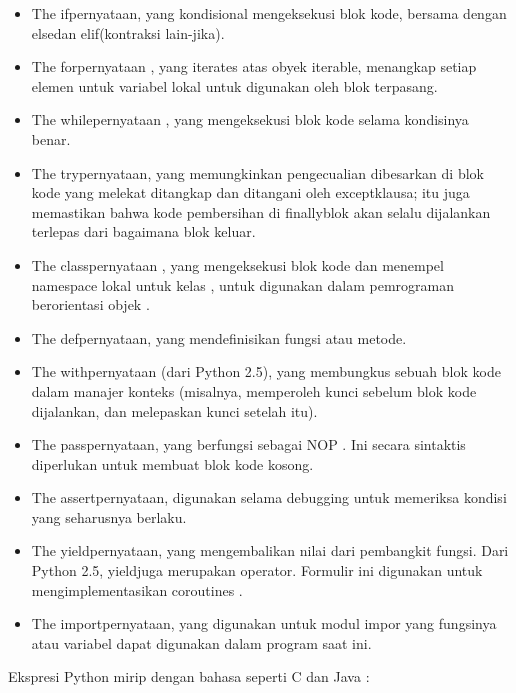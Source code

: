 \begin{itemize}
\item The ifpernyataan, yang kondisional mengeksekusi blok kode, bersama dengan elsedan elif(kontraksi lain-jika).\\
\item The forpernyataan , yang iterates atas obyek iterable, menangkap setiap elemen untuk variabel lokal untuk digunakan oleh blok terpasang.\\
\item The whilepernyataan , yang mengeksekusi blok kode selama kondisinya benar.\\
\item The trypernyataan, yang memungkinkan pengecualian dibesarkan di blok kode yang melekat ditangkap dan ditangani oleh exceptklausa; itu juga memastikan bahwa kode pembersihan di finallyblok akan selalu dijalankan terlepas dari bagaimana blok keluar.\\
\item The classpernyataan , yang mengeksekusi blok kode dan menempel namespace lokal untuk kelas , untuk digunakan dalam pemrograman berorientasi objek .\\
\item The defpernyataan, yang mendefinisikan fungsi atau metode.\\
\item The withpernyataan (dari Python 2.5), yang membungkus sebuah blok kode dalam manajer konteks (misalnya, memperoleh kunci sebelum blok kode dijalankan, dan melepaskan kunci setelah itu).\\
\item The passpernyataan, yang berfungsi sebagai NOP . Ini secara sintaktis diperlukan untuk membuat blok kode kosong.\\
\item The assertpernyataan, digunakan selama debugging untuk memeriksa kondisi yang seharusnya berlaku.\\
\item The yieldpernyataan, yang mengembalikan nilai dari pembangkit fungsi. Dari Python 2.5, yieldjuga merupakan operator. Formulir ini digunakan untuk mengimplementasikan coroutines .\\
\item The importpernyataan, yang digunakan untuk modul impor yang fungsinya atau variabel dapat digunakan dalam program saat ini.\\
\end{itemize}
	Ekspresi Python mirip dengan bahasa seperti C dan Java :\\
